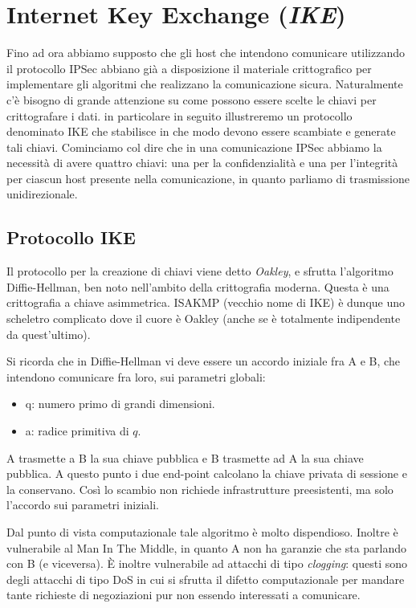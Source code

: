 \documentclass[14pt]{extreport}
\begin{document}
\section{Internet Key Exchange (\textit{IKE})}
Fino ad ora abbiamo supposto che gli host che intendono comunicare utilizzando il protocollo IPSec abbiano già a disposizione il materiale crittografico per implementare gli algoritmi che realizzano la comunicazione sicura.
Naturalmente c'è bisogno di grande attenzione su come possono essere scelte le chiavi per crittografare i dati.  in particolare in seguito illustreremo un protocollo denominato IKE che stabilisce in che modo devono essere scambiate  e generate tali chiavi.
Cominciamo col dire che in una comunicazione IPSec abbiamo la necessità di avere quattro chiavi: una per la confidenzialità e una per l'integrità per ciascun host presente nella comunicazione, in quanto parliamo di trasmissione unidirezionale.





\subsection{Protocollo IKE}
Il protocollo per la creazione di chiavi viene detto \textit{Oakley}, e sfrutta l'algoritmo Diffie-Hellman, ben noto nell'ambito della crittografia moderna. Questa è una crittografia a chiave asimmetrica. 
ISAKMP (vecchio nome di IKE) è dunque uno scheletro complicato dove il cuore è Oakley (anche se è totalmente indipendente da quest'ultimo).

Si ricorda che in Diffie-Hellman vi deve essere un accordo iniziale fra A e B, che intendono comunicare fra loro, sui parametri globali:

\begin{itemize}
    \item q: numero primo di grandi dimensioni.
    
    \item a: radice primitiva di $q$.
\end{itemize}

A trasmette a B la sua chiave pubblica e B trasmette ad A la sua chiave pubblica. A questo punto i due end-point calcolano la chiave privata di sessione e la conservano. Così lo scambio non richiede infrastrutture preesistenti, ma solo l'accordo sui parametri iniziali.

Dal punto di vista computazionale tale algoritmo è molto dispendioso. Inoltre è vulnerabile al Man In The Middle, in quanto A non ha garanzie che sta parlando con B (e viceversa). È inoltre vulnerabile ad attacchi di tipo \textit{clogging}: questi sono degli attacchi di tipo DoS in cui si sfrutta il difetto computazionale per mandare tante richieste di negoziazioni pur non essendo interessati a comunicare.
\end{document}
